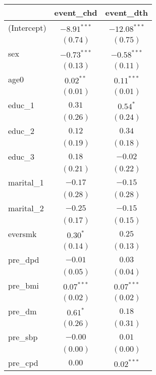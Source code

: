 
\begin{tabular}{l c c}
\toprule
 & event_chd & event_dth \\
\midrule
(Intercept)      & $-8.91^{***}$ & $-12.08^{***}$ \\
                 & $(0.74)$      & $(0.75)$       \\
sex              & $-0.73^{***}$ & $-0.58^{***}$  \\
                 & $(0.13)$      & $(0.11)$       \\
age0             & $0.02^{**}$   & $0.11^{***}$   \\
                 & $(0.01)$      & $(0.01)$       \\
educ\_1          & $0.31$        & $0.54^{*}$     \\
                 & $(0.26)$      & $(0.24)$       \\
educ\_2          & $0.12$        & $0.34$         \\
                 & $(0.19)$      & $(0.18)$       \\
educ\_3          & $0.18$        & $-0.02$        \\
                 & $(0.21)$      & $(0.22)$       \\
marital\_1       & $-0.17$       & $-0.15$        \\
                 & $(0.28)$      & $(0.28)$       \\
marital\_2       & $-0.25$       & $-0.15$        \\
                 & $(0.17)$      & $(0.15)$       \\
eversmk          & $0.30^{*}$    & $0.25$         \\
                 & $(0.14)$      & $(0.13)$       \\
pre\_dpd         & $-0.01$       & $0.03$         \\
                 & $(0.05)$      & $(0.04)$       \\
pre\_bmi         & $0.07^{***}$  & $0.07^{***}$   \\
                 & $(0.02)$      & $(0.02)$       \\
pre\_dm          & $0.61^{*}$    & $0.18$         \\
                 & $(0.26)$      & $(0.31)$       \\
pre\_sbp         & $-0.00$       & $0.01$         \\
                 & $(0.00)$      & $(0.00)$       \\
pre\_cpd         & $0.00$        & $0.02^{***}$   \\

\end{tabular}
